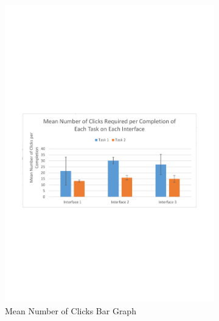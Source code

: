 \documentclass{l4proj}
\begin{document}
\begin{figure}[H]
	\begin{subfigure}{.5\textwidth}
		\centering
		\includegraphics[width=\textwidth]{charts/table3.pdf}
		\caption{Mean Number of Clicks Bar Graph}
		\label{ch:meanclicksbargraph}
	\end{subfigure}
	\begin{subfigure}{.5\textwidth}
		\centering

\end{subfigure}
\end{figure}
\end{document}
